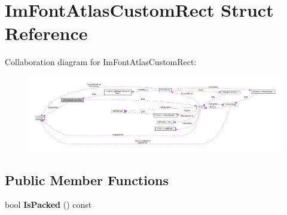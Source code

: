 \hypertarget{structImFontAtlasCustomRect}{}\section{Im\+Font\+Atlas\+Custom\+Rect Struct Reference}
\label{structImFontAtlasCustomRect}


Collaboration diagram for Im\+Font\+Atlas\+Custom\+Rect\+:\nopagebreak
\begin{figure}[H]
\begin{center}
\leavevmode
\includegraphics[width=350pt]{structImFontAtlasCustomRect__coll__graph}
\end{center}
\end{figure}
\subsection*{Public Member Functions}
\begin{DoxyCompactItemize}
\item 
\mbox{\label{structImFontAtlasCustomRect_a8829c3c64981078ba03d75c2b07e2abc}} 
bool {\bfseries Is\+Packed} () const
\end{DoxyCompactItemize}
